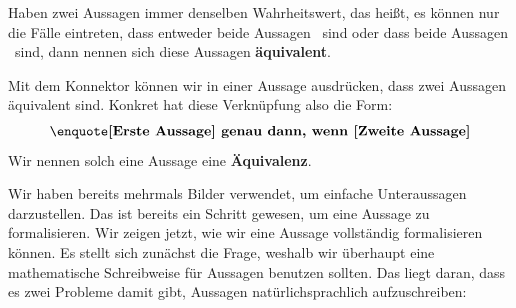 \documentclass[../../main.tex]{subfiles}
\begin{document}
Haben zwei Aussagen immer denselben Wahrheitswert, das heißt, es können nur die Fälle
eintreten, dass entweder beide Aussagen \wahr\  sind oder dass beide Aussagen \falsch\  sind,
dann nennen sich diese Aussagen \textbf{äquivalent}.

Mit dem Konnektor  
 können wir in einer Aussage ausdrücken, dass zwei Aussagen äquivalent sind. Konkret hat 
 diese Verknüpfung also die Form: 
 \[\statement{[Erste Aussage] genau dann, wenn 
 [Zweite Aussage]}\]
  Wir nennen solch eine Aussage eine \textbf{Äquivalenz}.

Wir haben bereits mehrmals Bilder verwendet, um einfache Unteraussagen darzustellen. 
Das ist bereits ein Schritt gewesen, um eine Aussage zu formalisieren. 
Wir zeigen jetzt, wie wir eine Aussage vollständig formalisieren können. 
Es stellt sich zunächst die Frage, weshalb wir überhaupt eine mathematische 
Schreibweise für Aussagen benutzen sollten. Das liegt daran, dass es zwei 
Probleme damit gibt, Aussagen natürlichsprachlich aufzuschreiben:
\end{document}
